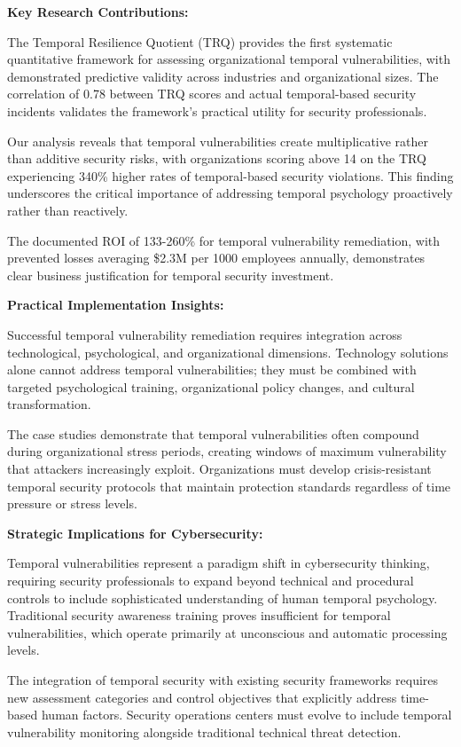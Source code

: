 \documentclass[11pt,a4paper]{article}
\begin{document}
\textbf{Key Research Contributions:}

The Temporal Resilience Quotient (TRQ) provides the first systematic quantitative framework for assessing organizational temporal vulnerabilities, with demonstrated predictive validity across industries and organizational sizes. The correlation of 0.78 between TRQ scores and actual temporal-based security incidents validates the framework's practical utility for security professionals.

Our analysis reveals that temporal vulnerabilities create multiplicative rather than additive security risks, with organizations scoring above 14 on the TRQ experiencing 340\% higher rates of temporal-based security violations. This finding underscores the critical importance of addressing temporal psychology proactively rather than reactively.

The documented ROI of 133-260\% for temporal vulnerability remediation, with prevented losses averaging \$2.3M per 1000 employees annually, demonstrates clear business justification for temporal security investment.

\textbf{Practical Implementation Insights:}

Successful temporal vulnerability remediation requires integration across technological, psychological, and organizational dimensions. Technology solutions alone cannot address temporal vulnerabilities; they must be combined with targeted psychological training, organizational policy changes, and cultural transformation.

The case studies demonstrate that temporal vulnerabilities often compound during organizational stress periods, creating windows of maximum vulnerability that attackers increasingly exploit. Organizations must develop crisis-resistant temporal security protocols that maintain protection standards regardless of time pressure or stress levels.

\textbf{Strategic Implications for Cybersecurity:}

Temporal vulnerabilities represent a paradigm shift in cybersecurity thinking, requiring security professionals to expand beyond technical and procedural controls to include sophisticated understanding of human temporal psychology. Traditional security awareness training proves insufficient for temporal vulnerabilities, which operate primarily at unconscious and automatic processing levels.

The integration of temporal security with existing security frameworks requires new assessment categories and control objectives that explicitly address time-based human factors. Security operations centers must evolve to include temporal vulnerability monitoring alongside traditional technical threat detection.
\end{document}
